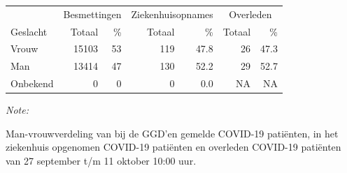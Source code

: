 \documentclass[
  english,
  man,floatsintext]{apa6}
\begin{document}
\begin{table}
\centering\begingroup\fontsize{11}{13}\selectfont

\begin{threeparttable}
\begin{tabular}{lrrrrrr}
\toprule
\multicolumn{1}{c}{ } & \multicolumn{2}{c}{Besmettingen} & \multicolumn{2}{c}{Ziekenhuisopnames} & \multicolumn{2}{c}{Overleden} \\
\cmidrule(l{3pt}r{3pt}){2-3} \cmidrule(l{3pt}r{3pt}){4-5} \cmidrule(l{3pt}r{3pt}){6-7}
Geslacht & Totaal & \% & Totaal & \% & Totaal & \%\\
\midrule
Vrouw & 15103 & 53 & 119 & 47.8 & 26 & 47.3\\
Man & 13414 & 47 & 130 & 52.2 & 29 & 52.7\\
Onbekend & 0 & 0 & 0 & 0.0 & NA & NA\\
\bottomrule
\end{tabular}
\begin{tablenotes}
\item \textit{Note: } 
\item Man-vrouwverdeling van bij de GGD’en gemelde COVID-19 patiënten, in het ziekenhuis opgenomen COVID-19 patiënten en overleden COVID-19 patiënten van 27 september t/m 11 oktober 10:00 uur.
\end{tablenotes}
\end{threeparttable}
\endgroup{}
\end{table}
\newpage
\end{document}
